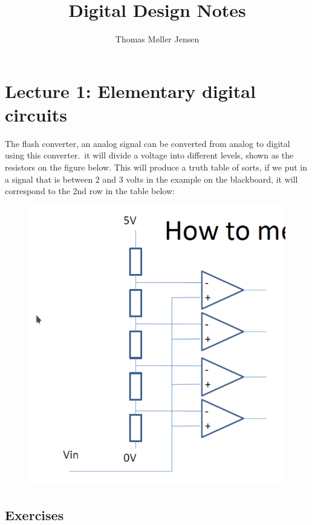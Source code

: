 \documentclass{article}
\title{Digital Design Notes}
\author{Thomas Møller Jensen}
\begin{document}
\maketitle
\section*{Lecture 1: Elementary digital circuits}
The flash converter, an analog signal can be converted from analog to digital using this converter.\ it will divide a voltage into different levels, shown as the resistors on the figure below.
This will produce a truth table of sorts, if we put in a signal that is between 2 and 3 volts in the example on the blackboard, it will correspond to the 2nd row in the table below:
\begin{figure}[H]
	\centering
	\includegraphics[width=\textwidth]{image.png}
\end{figure}

\subsection*{Exercises}
\end{document}
